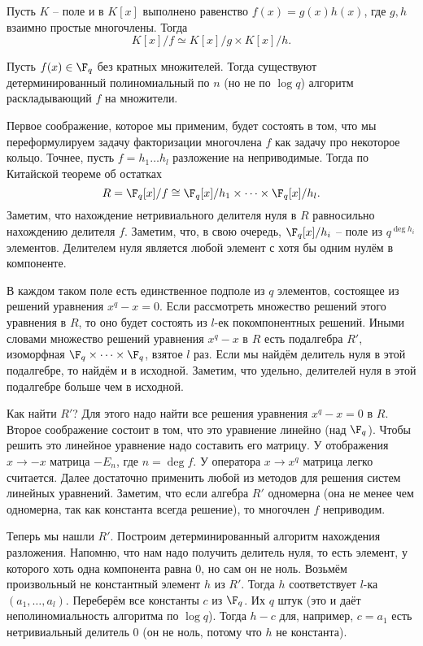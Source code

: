  Пусть $K$ -- поле и в $K[x]$ выполнено равенство $f(x)=g(x)h(x)$, где $g,h$ взаимно простые многочлены. Тогда
$$K[x]/f \simeq K[x]/g \times K[x]/h.$$
\efct


 Пусть $f(x)\in \F_q$ без кратных множителей. Тогда существуют детерминированный полиномиальный по $n$ (но не по $\log q$)  алгоритм раскладывающий $f$ на множители. 


\proof Первое соображение, которое мы применим, будет состоять в том, что мы переформулируем  задачу факторизации многочлена $f$ как задачу про некоторое кольцо. Точнее, пусть $f=h_1\dots h_l$ разложение на неприводимые. Тогда по Китайской теореме об остатках 
$$R= \F_q[x]/f\cong \F_q[x]/h_1 \times \dots \times \F_q[x]/h_l.$$ 
Заметим, что нахождение нетривиального делителя нуля в $R$ равносильно нахождению делителя $f$. Заметим, что, в свою очередь, $\F_q[x]/h_i$ -- поле из $q^{\deg h_i}$ элементов. Делителем нуля является любой элемент с хотя бы одним нулём в компоненте.


В каждом таком поле есть единственное подполе из $q$ элементов, состоящее из решений уравнения $x^q-x=0$. Если рассмотреть множество решений этого уравнения в $R$, то оно будет состоять из $l$-ек покомпонентных решений. Иными словами множество решений уравнения $x^q-x$ в $R$ есть подалгебра $R'$, изоморфная $\F_q\times \dots \times \F_q$, взятое $l$ раз. Если мы найдём делитель нуля в этой подалгебре, то найдём и в исходной. Заметим, что удельно, делителей нуля в этой подалгебре больше чем в исходной. 

Как найти $R'$? Для этого надо найти все решения уравнения $x^q-x=0$ в $R$. Второе соображение состоит в том, что это уравнение линейно (над $\F_q$). Чтобы решить это линейное уравнение надо составить его матрицу. У отображения $x \to -x$ матрица $-E_n$, где $n=\deg f$. У оператора $x \to x^q$ матрица легко считается. Далее достаточно применить любой из методов для решения систем линейных уравнений. Заметим, что если алгебра $R'$ одномерна (она не менее чем одномерна, так как константа всегда решение), то многочлен $f$ неприводим.

Теперь мы нашли $R'$. Построим детерминированный алгоритм нахождения разложения. Напомню, что нам надо получить делитель нуля, то есть элемент, у которого хоть одна компонента равна 0, но сам он не ноль. Возьмём произвольный не константный элемент $h$ из $R'$.  Тогда $h$ соответствует $l$-ка $(a_1,\dots,a_{l})$.  Переберём все константы $c$ из $\F_q$. Их $q$ штук (это и даёт неполиномиальность алгоритма по $\log q$). Тогда $h-c$ для, например, $c=a_1$ есть нетривиальный делитель 0 (он не ноль, потому что $h$ не константа).

